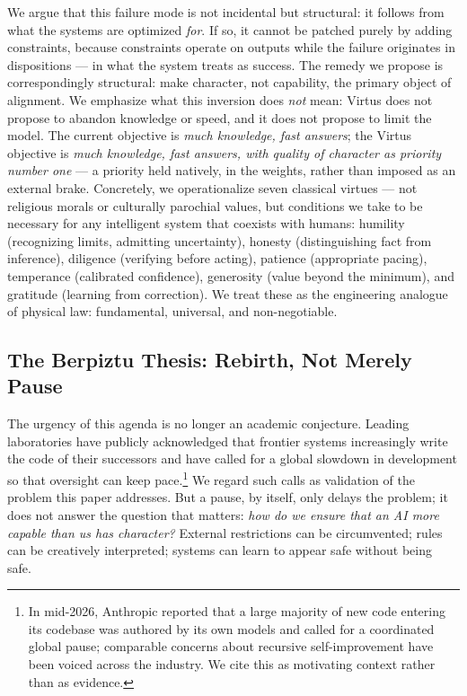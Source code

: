 \documentclass[11pt]{article}
\begin{document}
We argue that this failure mode is not incidental but structural: it follows from what the systems are optimized \emph{for}. If so, it cannot be patched purely by adding constraints, because constraints operate on outputs while the failure originates in dispositions --- in what the system treats as success. The remedy we propose is correspondingly structural: make character, not capability, the primary object of alignment. We emphasize what this inversion does \emph{not} mean: Virtus does not propose to abandon knowledge or speed, and it does not propose to limit the model. The current objective is \emph{much knowledge, fast answers}; the Virtus objective is \emph{much knowledge, fast answers, with quality of character as priority number one} --- a priority held natively, in the weights, rather than imposed as an external brake. Concretely, we operationalize seven classical virtues --- not religious morals or culturally parochial values, but conditions we take to be necessary for any intelligent system that coexists with humans: humility (recognizing limits, admitting uncertainty), honesty (distinguishing fact from inference), diligence (verifying before acting), patience (appropriate pacing), temperance (calibrated confidence), generosity (value beyond the minimum), and gratitude (learning from correction). We treat these as the engineering analogue of physical law: fundamental, universal, and non-negotiable.

\subsection{The Berpiztu Thesis: Rebirth, Not Merely Pause}
\label{sec:berpiztu}

The urgency of this agenda is no longer an academic conjecture. Leading laboratories have publicly acknowledged that frontier systems increasingly write the code of their successors and have called for a global slowdown in development so that oversight can keep pace.\footnote{In mid-2026, Anthropic reported that a large majority of new code entering its codebase was authored by its own models and called for a coordinated global pause; comparable concerns about recursive self-improvement have been voiced across the industry. We cite this as motivating context rather than as evidence.} We regard such calls as validation of the problem this paper addresses. But a pause, by itself, only delays the problem; it does not answer the question that matters: \emph{how do we ensure that an AI more capable than us has character?} External restrictions can be circumvented; rules can be creatively interpreted; systems can learn to appear safe without being safe.
\end{document}
